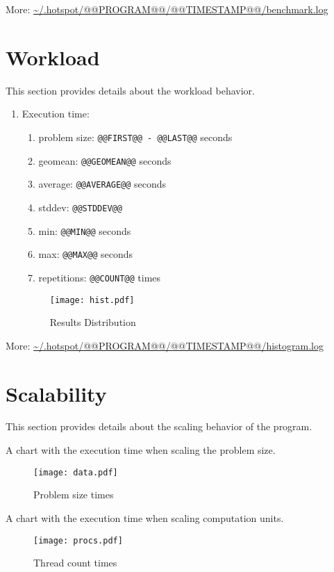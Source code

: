 \documentclass[a4paper]{article}
\begin{document}
More: \url{~/.hotspot/@@PROGRAM@@/@@TIMESTAMP@@/benchmark.log}

\section{Workload}

This section provides details about the workload behavior.

\begin{enumerate}
\item Execution time:
\begin{enumerate}
\item problem size: {\tt @@FIRST@@ - @@LAST@@} seconds
\item geomean: {\tt @@GEOMEAN@@} seconds
\item average: {\tt @@AVERAGE@@} seconds
\item stddev: {\tt @@STDDEV@@}
\item min: {\tt @@MIN@@} seconds
\item max: {\tt @@MAX@@} seconds
\item repetitions: {\tt @@COUNT@@} times
\end{enumerate}

\begin{figure}[H]
\label{fig:histogram}
\centering
\texttt{[image: hist.pdf]}
\caption{Results Distribution}
\end{figure}

\end{enumerate}

More: \url{~/.hotspot/@@PROGRAM@@/@@TIMESTAMP@@/histogram.log}

\section{Scalability}

This section provides details about the scaling behavior of the program.

A chart with the execution time when scaling the problem size.

\begin{figure}[H]
\label{fig:scaling}
\centering
\texttt{[image: data.pdf]}
\caption{Problem size times}
\end{figure}

A chart with the execution time when scaling computation units.

\begin{figure}[H]
\label{fig:threads}
\centering
\texttt{[image: procs.pdf]}
\caption{Thread count times}
\end{figure}
\end{document}
